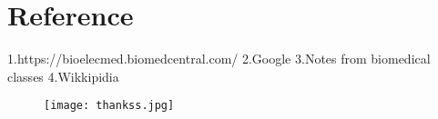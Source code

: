\documentclass[12pt]{report}
\begin{document}
\clearpage
\section{Reference}
1.https://bioelecmed.biomedcentral.com/
2.Google 
3.Notes from biomedical classes
4.Wikkipidia
\clearpage


\begin{figure}
\centering
\texttt{[image: thankss.jpg]}
\end{figure}











\clearpage
\end{document}
